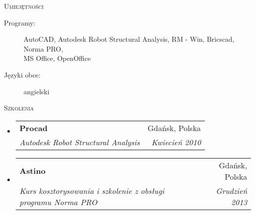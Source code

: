 \documentclass[letterpaper,11pt]{article}
\makeatletter
\newcommand{\resheading}[1]{
  \begin{tcolorbox}
  \textsc{#1}
  \end{tcolorbox}
}
\newcommand{\ressubheading}[4]{
\begin{tabular*}{6.5in}{l@{\extracolsep{\fill}}r}
		\textbf{#1} & #2 \\
		\textit{#3} & \textit{#4} \\
\end{tabular*}\vspace{-6pt}}
\makeatother
\begin{document}
\resheading{Umiejętności}

\begin{description}
 \item[Programy:]
   AutoCAD, Autodesk Robot Structural Analysis, RM - Win, Bricscad, Norma PRO,\\
   MS Office, OpenOffice
 \item[Języki obce:]
   angielski
\end{description}

\resheading{Szkolenia}

\begin{itemize}
\item
  \ressubheading{Procad}{Gdańsk, Polska}{Autodesk Robot Structural Analysis}{Kwiecień 2010}
\item
  \ressubheading{Astino}{Gdańsk, Polska}{Kurs kosztorysowania i szkolenie z obsługi programu Norma PRO}{Grudzień 2013}
\end{itemize}
\end{document}
